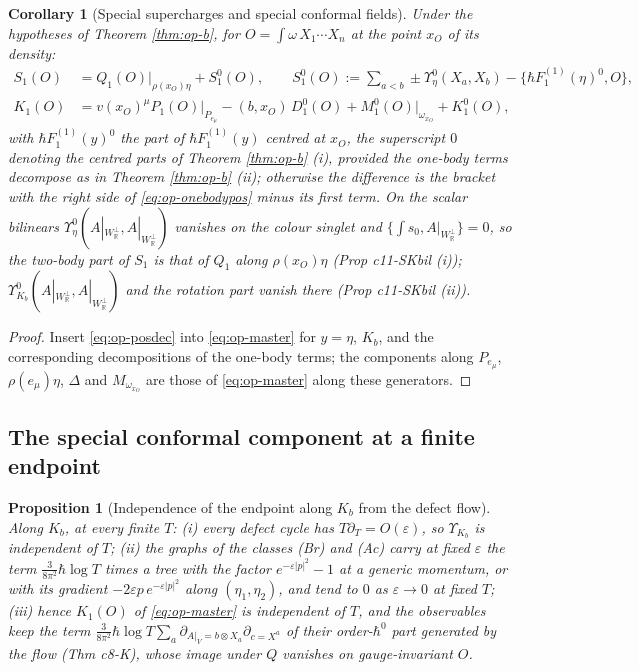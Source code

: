 \documentclass[11pt]{article}
\numberwithin{equation}{section}
\theoremstyle{plain}
\newtheorem{proposition}[theorem]{Proposition}
\newtheorem{corollary}[theorem]{Corollary}
\theoremstyle{definition}
\newcommand{\Ap}{A|_{W_{\mathbb R}^\perp}}
\newcommand{\AV}{A|_V}
\begin{document}
\begin{corollary}[Special supercharges and special conformal fields]
\label{cor:op-SK}
Under the hypotheses of Theorem \ref{thm:op-b}, for $O=\int\omega\,X_1\cdots X_n$ at the point $x_O$ of its density:
\[
\begin{aligned}
S_1(O)&=Q_1(O)\big|_{\rho(x_O)\eta}+S^0_1(O),\qquad S^0_1(O):=\sum_{a<b}\pm\Upsilon^0_\eta(X_a,X_b)-\{\hbar F_1^{(1)}(\eta)^0,O\},\\
K_1(O)&=v(x_O)^\mu P_1(O)\big|_{P_{e_\mu}}-(b,x_O)\,D^0_1(O)+M^0_1(O)\big|_{\omega_{x_O}}+K^0_1(O),
\end{aligned}
\]
with $\hbar F_1^{(1)}(y)^0$ the part of $\hbar F_1^{(1)}(y)$ centred at $x_O$, the superscript $0$ denoting the centred parts of Theorem \ref{thm:op-b} (i), provided the one-body terms decompose as in Theorem \ref{thm:op-b} (ii); otherwise the difference is the bracket with the right side of \eqref{eq:op-onebodypos} minus its first term. On the scalar bilinears $\Upsilon^0_\eta(\Ap,\Ap)$ vanishes on the colour singlet and $\{\int s_0,\Ap\}=0$, so the two-body part of $S_1$ is that of $Q_1$ along $\rho(x_O)\eta$ (Prop c11-SKbil (i)); $\Upsilon^0_{K_b}(\Ap,\Ap)$ and the rotation part vanish there (Prop c11-SKbil (ii)).
\end{corollary}

\begin{proof}
Insert \eqref{eq:op-posdec} into \eqref{eq:op-master} for $y=\eta$, $K_b$, and the corresponding decompositions of the one-body terms; the components along $P_{e_\mu}$, $\rho(e_\mu)\eta$, $\Delta$ and $M_{\omega_{x_O}}$ are those of \eqref{eq:op-master} along these generators.
\end{proof}

\subsection{The special conformal component at a finite endpoint}

\begin{proposition}[Independence of the endpoint along $K_b$ from the defect flow]
\label{prop:op-KT}
Along $K_b$, at every finite $T$: (i) every defect cycle has $T\partial_T=O(\varepsilon)$, so $\Upsilon_{K_b}$ is independent of $T$; (ii) the graphs of the classes (Br) and (Ac) carry at fixed $\varepsilon$ the term $\tfrac3{8\pi^2}\hbar\log T$ times a tree with the factor $e^{-\varepsilon|p|^2}-1$ at a generic momentum, or with its gradient $-2\varepsilon p\,e^{-\varepsilon|p|^2}$ along $(\eta_1,\eta_2)$, and tend to $0$ as $\varepsilon\to0$ at fixed $T$; (iii) hence $K_1(O)$ of \eqref{eq:op-master} is independent of $T$, and the observables keep the term $\tfrac3{8\pi^2}\hbar\log T\sum_a\partial_{\AV=b\otimes X_a}\partial_{c=X^a}$ of their order-$\hbar^0$ part generated by the flow (Thm c8-K), whose image under $Q$ vanishes on gauge-invariant $O$.
\end{proposition}
\end{document}
